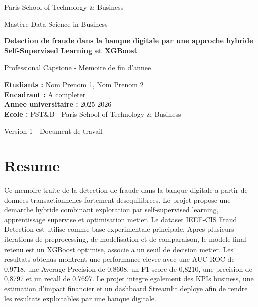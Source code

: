 \documentclass[12pt,a4paper]{report}
\begin{document}

\begin{titlepage}
    \centering
    \vspace*{1cm}
    {\Large Paris School of Technology \& Business \par}
    \vspace{0.5cm}
    {\large Mast\`ere Data Science in Business \par}
    \vspace{2cm}
    {\Huge\bfseries Detection de fraude dans la banque digitale par une approche hybride Self-Supervised Learning et XGBoost \par}
    \vspace{1cm}
    {\Large Professional Capstone - Memoire de fin d'annee \par}
    \vspace{2cm}
    \begin{flushleft}
    \textbf{Etudiants :} Nom Prenom 1, Nom Prenom 2\\
    \textbf{Encadrant :} A completer\\
    \textbf{Annee universitaire :} 2025-2026\\
    \textbf{Ecole :} PST\&B - Paris School of Technology \& Business
    \end{flushleft}
    \vfill
    {\large Version 1 - Document de travail \par}
\end{titlepage}

\chapter*{Resume}

Ce memoire traite de la detection de fraude dans la banque digitale a partir de donnees transactionnelles fortement desequilibrees. Le projet propose une demarche hybride combinant exploration par self-supervised learning, apprentissage supervise et optimisation metier. Le dataset IEEE-CIS Fraud Detection est utilise comme base experimentale principale. Apres plusieurs iterations de preprocessing, de modelisation et de comparaison, le modele final retenu est un XGBoost optimise, associe a un seuil de decision metier. Les resultats obtenus montrent une performance elevee avec une AUC-ROC de 0,9718, une Average Precision de 0,8608, un F1-score de 0,8210, une precision de 0,8797 et un recall de 0,7697. Le projet integre egalement des KPIs business, une estimation d'impact financier et un dashboard Streamlit deploye afin de rendre les resultats exploitables par une banque digitale.
\end{document}

